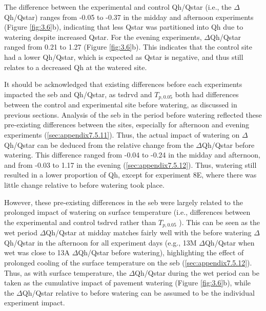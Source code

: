 \documentclass[final,3p,times,authoryear]{elsarticle}
\begin{document}
The difference between the experimental and control \gls{Qh}/\gls{Qstar} (i.e., the $\Delta$\gls{Qh}/\gls{Qstar}) ranges from -0.05 to -0.37 in the midday and afternoon experiments (Figure \ref{fig:3.6}b), indicating that less \gls{Qstar} was partitioned into \gls{Qh} due to watering despite increased \gls{Qstar}. For the evening experiments, $\Delta$\gls{Qh}/\gls{Qstar} ranged from 0.21 to 1.27 (Figure \ref{fig:3.6}b). This indicates that the control site had a lower \gls{Qh}/\gls{Qstar}, which is expected as \gls{Qstar} is negative, and thus still relates to a decreased \gls{Qh} at the watered site.

It should be acknowledged that existing differences before each experiments impacted
the \gls{seb} and \gls{Qh}/\gls{Qstar}, as \gls{tsdrvd} and $T_{p,0.05}$ both had differences between the control and experimental site before watering, as discussed in previous sections. Analysis of the \gls{seb} in the period before watering reflected these pre-existing differences between the sites, especially for afternoon and evening experiments (\ref{sec:appendix7.5.11}). Thus, the actual impact of watering on $\Delta$\gls{Qh}/\gls{Qstar} can be deduced from the relative change from the $\Delta$\gls{Qh}/\gls{Qstar} before watering. This difference ranged from -0.04 to -0.24 in the midday and afternoon, and from -0.03 to 1.17 in the evening (\ref{sec:appendix7.5.12}). Thus, watering still resulted in a lower proportion of \gls{Qh}, except for experiment 8E, where there was little change relative to before watering took place.

However, these pre-existing differences in the \gls{seb} were largely related to the prolonged impact of watering on surface temperature (i.e., differences between the experimental and control \gls{tsdrvd} rather than $T_{p,0.05}$ ). This can be seen as the wet period $\Delta$\gls{Qh}/\gls{Qstar} at midday matches fairly well with the before watering $\Delta$\gls{Qh}/\gls{Qstar} in the afternoon for all experiment days (e.g., 13M $\Delta$\gls{Qh}/\gls{Qstar} when wet was close to 13A $\Delta$\gls{Qh}/\gls{Qstar} before watering), highlighting the effect of prolonged cooling of the surface temperature on the \gls{seb} (\ref{sec:appendix7.5.12}). Thus, as with surface temperature, the $\Delta$\gls{Qh}/\gls{Qstar} during the wet period can be taken as the cumulative impact of pavement watering (Figure \ref{fig:3.6}b), while the $\Delta$\gls{Qh}/\gls{Qstar} relative to before watering can be assumed to be the individual experiment impact.
\end{document}

